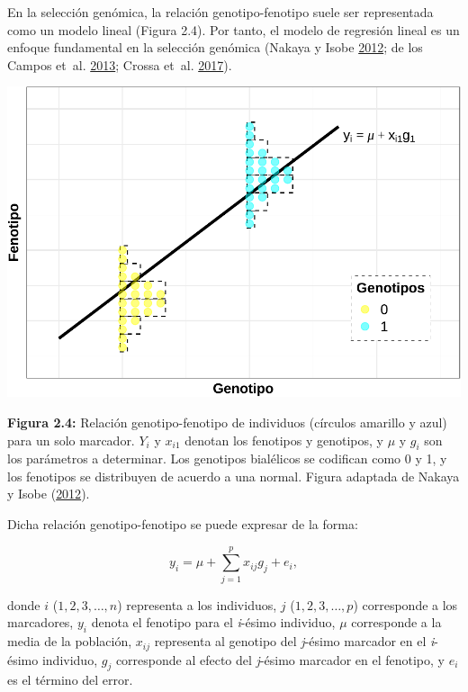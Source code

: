 \documentclass[11pt,spanish,a4paper,oneside,]{book} %
\begin{document}
En la selección genómica, la relación genotipo-fenotipo suele ser representada como un modelo lineal (Figura 2.4). Por tanto, el modelo de regresión lineal es un enfoque fundamental en la selección genómica (Nakaya y Isobe \protect\hyperlink{ref-cite:6}{2012}; de los Campos et~al. \protect\hyperlink{ref-cite:31}{2013}; Crossa et~al. \protect\hyperlink{ref-cite:37}{2017}).

\begin{center}\includegraphics[width=1\linewidth]{figures/Mod_RL} \end{center}

\noindent 
\textbf{Figura 2.4:} Relación genotipo-fenotipo de individuos (círculos amarillo y azul) para un solo marcador. \(Y_{i}\) y \(x_{i1}\) denotan los fenotipos y genotipos, y \(\mu\) y \(g_{i}\) son los parámetros a determinar. Los genotipos bialélicos se codifican como 0 y 1, y los fenotipos se distribuyen de acuerdo a una normal. Figura adaptada de Nakaya y Isobe (\protect\hyperlink{ref-cite:6}{2012}).

\hspace*{1em}

Dicha relación genotipo-fenotipo se puede expresar de la forma:

\begin{equation}
y_{i} = \mu + \sum_{j = 1}^{p}x_{ij}g_{j} + e_{i},
\end{equation}

donde \(i\) (\(1, 2, 3, …, n\)) representa a los individuos, \(j\) (\(1, 2, 3, …, p\)) corresponde a los marcadores, \(y_{i}\) denota el fenotipo para el \emph{i}-ésimo individuo, \(\mu\) corresponde a la media de la población, \(x_{ij}\) representa al genotipo del \emph{j}-ésimo marcador en el \emph{i}-ésimo individuo, \(g_{j}\) corresponde al efecto del \emph{j}-ésimo marcador en el fenotipo, y \(e_{i}\) es el término del error.
\end{document}
